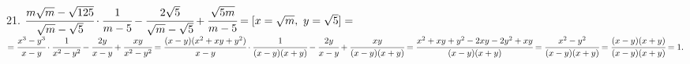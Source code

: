 21. $\cfrac{m\sqrt{m}-\sqrt{125}}{\sqrt{m}-\sqrt{5}}\cdot\cfrac{1}{m-5}-\cfrac{2\sqrt{5}}{\sqrt{m}-\sqrt{5}}+\cfrac{\sqrt{5m}}{m-5}=[x=\sqrt{m},\ y=\sqrt{5}]=$\\$=
\cfrac{x^3-y^3}{x-y}\cdot\cfrac{1}{x^2-y^2}-\cfrac{2y}{x-y}+\cfrac{xy}{x^2-y^2}=
\cfrac{(x-y)(x^2+xy+y^2)}{x-y}\cdot\cfrac{1}{(x-y)(x+y)}-\cfrac{2y}{x-y}+\cfrac{xy}{(x-y)(x+y)}=
\cfrac{x^2+xy+y^2-2xy-2y^2+xy}{(x-y)(x+y)}=\cfrac{x^2-y^2}{(x-y)(x+y)}=\cfrac{(x-y)(x+y)}{(x-y)(x+y)}=1.$\\
